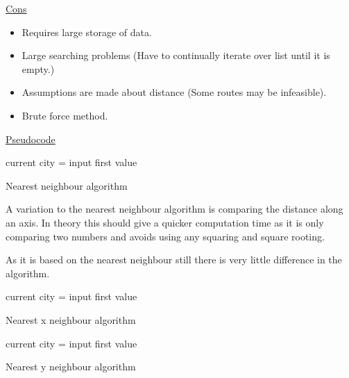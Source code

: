 \documentclass[conference,backref=page]{acmsiggraph}
\begin{document}
\underline{Cons}
\begin{itemize}
	\item Requires large storage of data. 
	\item Large searching problems (Have to continually iterate over list until it is empty.)
	\item Assumptions are made about distance (Some routes may be infeasible).
	\item Brute force method.
\end{itemize}

\underline{Pseudocode}


\begin{algorithm}
	current city = input first value\
\caption{Nearest neighbour algorithm}
\end{algorithm}



A variation to the nearest neighbour algorithm is comparing the distance along an axis. In theory this should give a quicker computation time as it is only comparing two numbers and avoids using any squaring and square rooting.

As it is based on the nearest neighbour still there is very little difference in the algorithm. 

\begin{algorithm}
	current city = input first value\
	\caption{Nearest x neighbour algorithm}
\end{algorithm}

\begin{algorithm}
	current city = input first value\
	\caption{Nearest y neighbour algorithm}
\end{algorithm}
\end{document}
